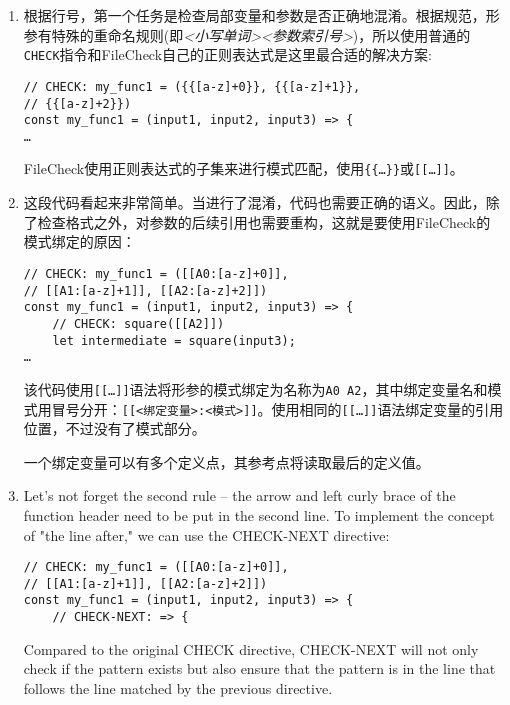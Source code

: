 \begin{enumerate}
\item 根据行号，第一个任务是检查局部变量和参数是否正确地混淆。根据规范，形参有特殊的重命名规则(即\textit{<小写单词><参数索引号>})，所以使用普通的\texttt{CHECK}指令和FileCheck自己的正则表达式是这里最合适的解决方案:

\begin{lstlisting}[style=styleJavaScript]
// CHECK: my_func1 = ({{[a-z]+0}}, {{[a-z]+1}},
// {{[a-z]+2}})
const my_func1 = (input1, input2, input3) => {
…
\end{lstlisting}

FileCheck使用正则表达式的子集来进行模式匹配，使用\texttt{\{\{…\}\}}或\texttt{[[…]]}。

\item 这段代码看起来非常简单。当进行了混淆，代码也需要正确的语义。因此，除了检查格式之外，对参数的后续引用也需要重构，这就是要使用FileCheck的模式绑定的原因：

\begin{lstlisting}[style=styleJavaScript]
// CHECK: my_func1 = ([[A0:[a-z]+0]],
// [[A1:[a-z]+1]], [[A2:[a-z]+2]])
const my_func1 = (input1, input2, input3) => {
	// CHECK: square([[A2]])
	let intermediate = square(input3);
…
\end{lstlisting}

该代码使用\texttt{[[…]]}语法将形参的模式绑定为名称为\texttt{A0~A2}，其中绑定变量名和模式用冒号分开：\texttt{[[<绑定变量>:<模式>]]}。使用相同的\texttt{[[…]]}语法绑定变量的引用位置，不过没有了模式部分。

\begin{tcolorbox}[colback=blue!5!white,colframe=blue!75!black, fonttitle=\bfseries,title=Note]
\hspace*{0.7cm}一个绑定变量可以有多个定义点，其参考点将读取最后的定义值。
\end{tcolorbox}

\item Let's not forget the second rule – the arrow and left curly brace of the function header need to be put in the second line. To implement the concept of "the line after," we can use the CHECK-NEXT directive:

\begin{lstlisting}[style=styleJavaScript]
// CHECK: my_func1 = ([[A0:[a-z]+0]],
// [[A1:[a-z]+1]], [[A2:[a-z]+2]])
const my_func1 = (input1, input2, input3) => {
	// CHECK-NEXT: => {
\end{lstlisting}

Compared to the original CHECK directive, CHECK-NEXT will not only check if the pattern exists but also ensure that the pattern is in the line that follows the line matched by the previous directive.


\end{enumerate}

